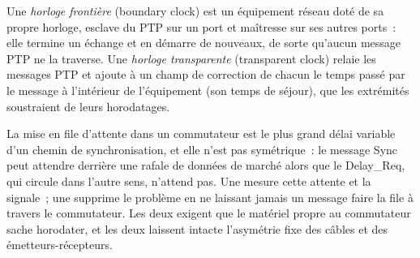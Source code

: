 \begin{definition}\label{def:nw:time-synchronisation:bc}
Une \emph{horloge frontière} (boundary clock) est un équipement réseau doté de sa propre horloge, esclave du PTP sur un port et maîtresse sur
ses autres ports~: elle termine un échange et en démarre de nouveaux, de sorte qu'aucun message PTP ne la traverse. Une \emph{horloge transparente}
(transparent clock) relaie les messages PTP et ajoute à un champ de correction de chacun le temps passé par le message à l'intérieur de l'équipement (son temps
de séjour), que les extrémités soustraient de leurs horodatages.
\end{definition}

La mise en file d'attente dans un commutateur est le plus grand délai variable d'un chemin de synchronisation, et elle n'est pas symétrique~: le message Sync peut attendre derrière
une rafale de données de marché alors que le Delay\_Req, qui circule dans l'autre sens, n'attend pas. Une  mesure cette attente et la signale~; une
 supprime le problème en ne laissant jamais un message faire la file à travers le commutateur. Les deux exigent que le matériel propre au commutateur sache horodater, et
les deux laissent intacte l'asymétrie fixe des câbles et des émetteurs-récepteurs.

